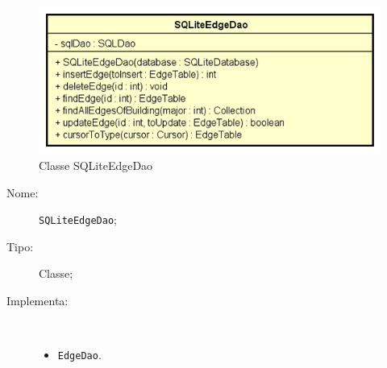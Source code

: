 \documentclass[../DefinizioneDiProdotto.tex]{subfiles}
\begin{document}
    \begin{figure}[H]
        \centering
        \includegraphics{img/SQLiteEdgeDao.png}
        \caption{Classe SQLiteEdgeDao}\label{fig:model::dataaccess::dao::SQLiteEdgeDao} 
    \end{figure}
    \begin{description}
\item[Nome:] \texttt{SQLiteEdgeDao};
\item[Tipo:] Classe;
\item[Implementa:] \
\begin{itemize}
\item \texttt{EdgeDao}.


\end{itemize}
\end{description}
\end{document}
